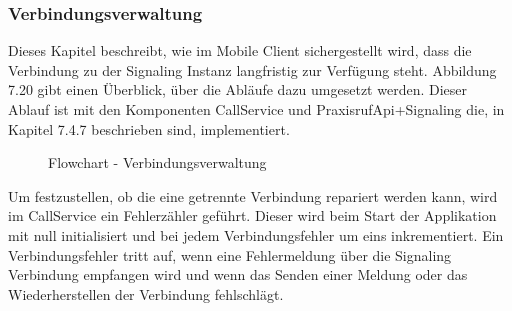 \subsubsection{Verbindungsverwaltung}

Dieses Kapitel beschreibt, wie im Mobile Client sichergestellt wird, dass die Verbindung zu der Signaling Instanz langfristig zur Verfügung steht.
Abbildung 7.20 gibt einen Überblick, über die Abläufe dazu umgesetzt werden.
Dieser Ablauf ist mit den Komponenten CallService und PraxisrufApi+Signaling die, in Kapitel 7.4.7 beschrieben sind, implementiert.

\begin{figure}[h]
    \centering
    \begin{minipage}[b]{1\textwidth}
        \caption{Flowchart - Verbindungsverwaltung}
    \end{minipage}
\end{figure}

Um festzustellen, ob die eine getrennte Verbindung repariert werden kann, wird im CallService ein Fehlerzähler geführt.
Dieser wird beim Start der Applikation mit null initialisiert und bei jedem Verbindungsfehler um eins inkrementiert.
Ein Verbindungsfehler tritt auf, wenn eine Fehlermeldung über die Signaling Verbindung empfangen wird und wenn das Senden einer Meldung oder das Wiederherstellen der Verbindung fehlschlägt.

